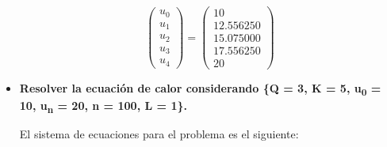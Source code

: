\begin{itemize}
          \begin{equation}
              \begin{pmatrix}
                  u_0 \\
                  u_1 \\
                  u_2 \\
                  u_3 \\
                  u_4
              \end{pmatrix}    =
              \begin{pmatrix}
                  10        \\
                  12.556250 \\
                  15.075000 \\
                  17.556250 \\
                  20
              \end{pmatrix}
              \label{eq:problem1a_solution}
          \end{equation}


    \item \textbf{Resolver la ecuación de calor considerando \{Q = 3, K = 5, u\textsubscript{0} = 10, u\textsubscript{n} = 20, n = 100, L = 1\}.}

          El sistema de ecuaciones para el problema es el siguiente:


\end{itemize}
